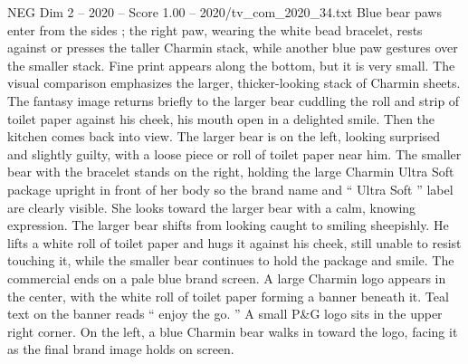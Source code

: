 \begin{textsample}{NEG Dim 2 – 2020 – Score 1.00 – 2020/tv\_com\_2020\_34.txt}
Blue bear paws enter from the sides ; the right paw, wearing the white bead bracelet, rests against or presses the taller Charmin stack, while another blue paw gestures over the smaller stack.
Fine print appears along the bottom, but it is very small.
The visual comparison emphasizes the larger, thicker-looking stack of Charmin sheets.
The fantasy image returns briefly to the larger bear cuddling the roll and strip of toilet paper against his cheek, his mouth open in a delighted smile.
Then the kitchen comes back into view.
The larger bear is on the left, looking surprised and slightly guilty, with a loose piece or roll of toilet paper near him.
The smaller bear with the bracelet stands on the right, holding the large Charmin Ultra Soft package upright in front of her body so the brand name and “ Ultra Soft ” label are clearly visible.
She looks toward the larger bear with a calm, knowing expression.
The larger bear shifts from looking caught to smiling sheepishly.
He lifts a white roll of toilet paper and hugs it against his cheek, still unable to resist touching it, while the smaller bear continues to hold the package and smile.
The commercial ends on a pale blue brand screen.
A large Charmin logo appears in the center, with the white roll of toilet paper forming a banner beneath it.
Teal text on the banner reads “ enjoy the go. ” A small P\&G logo sits in the upper right corner.
On the left, a blue Charmin bear walks in toward the logo, facing it as the final brand image holds on screen.

\end{textsample}
